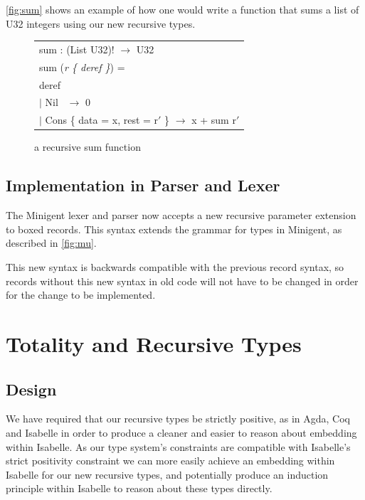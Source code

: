 \autoref{fig:sum} shows an example of how one would write a function that sums a list of \textsf{U32} integers
using our new recursive types.

\begin{figure}%
    \begin{center}
        \begin{tabular}{l}
            sum : (List U32)! $\rightarrow$ U32 \\
            sum (\textit{r \{ deref \}}) = \\
            \hspace{0.8em} deref \\
                \hspace{2em} $\vert$ Nil  \quad\quad\quad$\,$   $\rightarrow$ 0 \\
                \hspace{2em} $\vert$ Cons \{ data = x, rest = r$'$ \}  $\rightarrow$ x + sum r$'$
        \end{tabular}
    \end{center}
    \caption[short]{a recursive sum function}
    \label{fig:sum}
\end{figure}

\subsection{Implementation in Parser and Lexer}

The Minigent lexer and parser now accepts a new recursive parameter extension to boxed records. 
This syntax extends the grammar for types in Minigent, as described in \autoref{fig:mu}.

This new syntax is backwards compatible with the previous record syntax, so records without this new
syntax in old code will not have to be changed in order for the change to be implemented.

\FloatBarrier

\section{Totality and Recursive Types}

\subsection{Design}

We have required that our recursive types be strictly positive, as in Agda,
Coq and Isabelle in order to produce a cleaner and easier to reason about
embedding within Isabelle. As our type system's constraints are compatible with Isabelle's
strict positivity constraint we can more easily achieve an embedding within Isabelle for our new
recursive types, and potentially produce an induction principle within Isabelle to reason
about these types directly.

